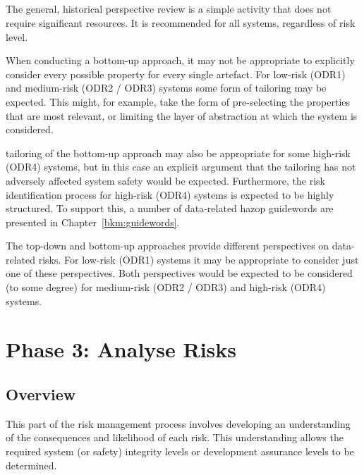 \subsection{}
The general, historical perspective review is a simple activity that does not require significant resources. It is recommended for all systems, regardless of risk level.

When conducting a bottom-up approach, it may not be appropriate to explicitly consider every possible property for every single artefact. For low-risk (ODR1) and medium-risk (ODR2 / ODR3) systems some form of \gls{tailoring} may be expected. This might, for example, take the form of pre-selecting the properties that are most relevant, or limiting the layer of abstraction at which the system is considered.

\Gls{tailoring} of the bottom-up approach may also be appropriate for some high-risk (ODR4) systems, but in this case an explicit argument that the \gls{tailoring} has not adversely affected system safety would be expected. Furthermore, the risk identification process for high-risk (ODR4) systems is expected to be highly structured. To support this, a number of data-related \gls{hazop} guidewords are presented in Chapter~\ref{bkm:guidewords}.

The top-down and bottom-up approaches provide different perspectives on data-related risks. For low-risk (ODR1) systems it may be appropriate to consider just one of these perspectives. Both perspectives would be expected to be considered (to some degree) for medium-risk (ODR2 / ODR3) and high-risk (ODR4) systems.

\section{Phase 3: Analyse Risks}
\subsection{Overview}
This part of the risk management process involves developing an understanding of the consequences and likelihood of each risk. This understanding allows the required system (or safety) \gls{integrity} levels or development assurance levels to be determined.
%
%
